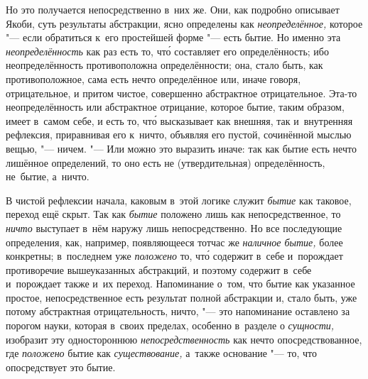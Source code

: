 Но это получается непосредственно в~них же. Они, как подробно описывает Якоби,
суть результаты абстракции, ясно определены как {\em неопределённое,} которое
"--- если обратиться к~его простейшей форме "--- есть бытие. Но именно эта
{\em неопределённость} как раз есть то, чт\'{о} составляет его определённость;
ибо неопределённость противоположна определённости; она, стало быть, как
противоположное, сама есть нечто определённое или, иначе говоря, отрицательное,
и притом чистое, совершенно абстрактное отрицательное. Эта-то неопределённость
или абстрактное отрицание, которое бытие, таким образом, имеет в~самом себе, и
есть то, чт\'{о} высказывает как внешняя, так и~внутренняя рефлексия,
приравнивая его к~ничто, объявляя его пустой, сочинённой мыслью вещью,
"--- ничем. "--- Или можно это выразить иначе: так как бытие есть нечто
лишённое определений, то оно есть не (утвердительная) определённость, не~бытие,
а~ничто.

В чистой рефлексии начала, каковым в~этой логике служит {\em бытие} как
таковое, переход ещё скрыт. Так как {\em бытие} положено лишь как
непосредственное, то {\em ничто} выступает в~нём наружу лишь непосредственно.
Но все последующие определения, как, например, появляющееся тотчас же
{\em наличное бытие,} более конкретны; в~последнем уже {\em положено} то,
чт\'{о} содержит в~себе и~порождает противоречие вышеуказанных абстракций, и
поэтому содержит в~себе и~порождает также и~их переход. Напоминание
о~том, что бытие как указанное простое, непосредственное есть
результат полной абстракции и, стало быть, уже потому абстрактная
отрицательность, ничто, "--- это напоминание оставлено за порогом науки,
которая в~своих пределах, особенно в~разделе о {\em сущности,} изобразит
эту одностороннюю {\em непосредственность} как нечто опосредствованное,
где {\em положено} бытие как {\em существование,} а~также основание "---
то, что опосредствует это бытие.

